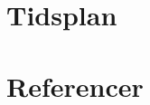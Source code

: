 \thispagestyle{fancy}
\chapter{Tidsplan}
\label{app:tidsplan}

\chapter{Referencer}

\newpage
\listoffigures

\newpage
\listoftables